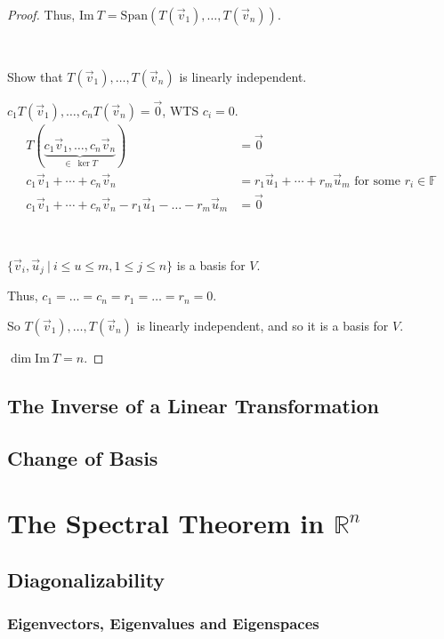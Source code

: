 \documentclass[11pt,fleqn]{book} %
\begin{document}
\begin{proof}
    Thus, $\mathrm{Im}~T = \mathrm{Span}\left( T(\vec{v}_1), \dots, T(\vec{v}_n) \right)$.

    {~~~}

    Show that $T(\vec{v}_1), \dots, T(\vec{v}_n)$ is linearly independent.

    $c_1 T(\vec{v}_1), \dots, c_nT(\vec{v}_n) = \vec{0}$, WTS $c_i = 0$.
    \begin{align*}
        T ( \underbrace{c_1\vec{v}_1, \dots, c_n\vec{v}_n}_{\in~\ker T} )
        &= \vec{0}
        \\
        c_1\vec{v}_1 + \cdots + c_n\vec{v}_n
        &= r_1\vec{u}_1 + \cdots + r_m\vec{u}_m \text{ for some } r_i \in \mathbb{F}
        \\
        c_1\vec{v}_1 + \cdots + c_n\vec{v}_n - r_1\vec{u}_1 - \dots - r_m\vec{u}_m
        &= \vec{0}
    \end{align*}

    {~~~}

    $\{\vec{v}_i, \vec{u}_j ~|~  i \le u \le m, 1 \le j \le n \}$ is a basis for $V$.

    Thus, $c_1 = \dots = c_n = r_1 = \dots = r_n = 0$.

    So $T(\vec{v}_1), \dots, T(\vec{v}_n)$ is linearly independent, and so it is a basis for $V$.

    $\dim \mathrm{Im}~T = n$.
\end{proof}

\section{The Inverse of a Linear Transformation}

\section{Change of Basis}

\chapter{The Spectral Theorem in $\mathbb{R}^n$}

\section{Diagonalizability}

\subsection{Eigenvectors, Eigenvalues and Eigenspaces}
\end{document}
